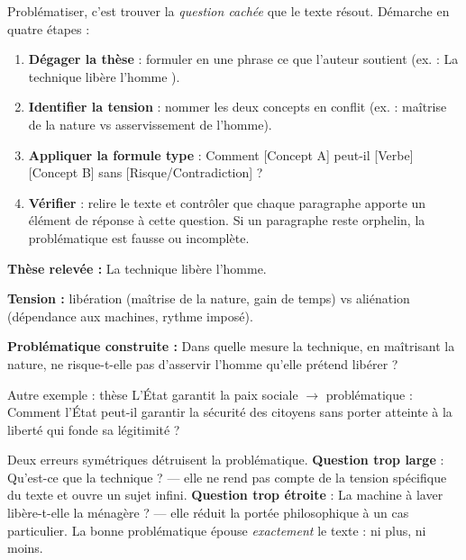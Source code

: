 \documentclass[11pt]{article}
\begin{document}
\begin{methode}
Problématiser, c'est trouver la \emph{question cachée} que le texte résout. Démarche en quatre étapes :
\begin{enumerate}
\item \textbf{Dégager la thèse} : formuler en une phrase ce que l'auteur soutient (ex. : \og La technique libère l'homme \fg{}).
\item \textbf{Identifier la tension} : nommer les deux concepts en conflit (ex. : maîtrise de la nature vs asservissement de l'homme).
\item \textbf{Appliquer la formule type} : \og Comment [Concept A] peut-il [Verbe] [Concept B] sans [Risque/Contradiction] ? \fg{}
\item \textbf{Vérifier} : relire le texte et contrôler que chaque paragraphe apporte un élément de réponse à cette question. Si un paragraphe reste orphelin, la problématique est fausse ou incomplète.
\end{enumerate}
\end{methode}

\begin{exemplebox}
\textbf{Thèse relevée :} \og La technique libère l'homme. \fg{}\par
\textbf{Tension :} libération (maîtrise de la nature, gain de temps) vs aliénation (dépendance aux machines, rythme imposé).\par
\textbf{Problématique construite :} \og Dans quelle mesure la technique, en maîtrisant la nature, ne risque-t-elle pas d'asservir l'homme qu'elle prétend libérer ? \fg{}\par\medskip
Autre exemple : thèse \og L'État garantit la paix sociale \fg{} $\rightarrow$ problématique : \og Comment l'État peut-il garantir la sécurité des citoyens sans porter atteinte à la liberté qui fonde sa légitimité ? \fg{}
\end{exemplebox}

\begin{attention}
Deux erreurs symétriques détruisent la problématique. \textbf{Question trop large} : \og Qu'est-ce que la technique ? \fg{} — elle ne rend pas compte de la tension spécifique du texte et ouvre un sujet infini. \textbf{Question trop étroite} : \og La machine à laver libère-t-elle la ménagère ? \fg{} — elle réduit la portée philosophique à un cas particulier. La bonne problématique épouse \emph{exactement} le texte : ni plus, ni moins.
\end{attention}
\end{document}
